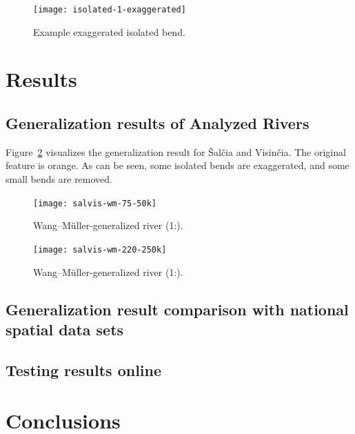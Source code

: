 \documentclass[a4paper]{article}
\newcommand{\WM}{Wang--M{\"u}ller}
\begin{document}
\begin{figure}[ht]
    \centering
    \texttt{[image: isolated-1-exaggerated]}
    \caption{Example exaggerated isolated bend.}
    \label{fig:isolated-1-exaggerated}
\end{figure}

\section{Results}

\subsection{Generalization results of Analyzed Rivers}

Figure~\ref{fig:salvis-wm-75-50k} visualizes the generalization result for
Šalčia and Visinčia. The original feature is orange. As can be seen, some
isolated bends are exaggerated, and some small bends are removed.

\begin{figure}[ht]
    \centering
    \texttt{[image: salvis-wm-75-50k]}
    \caption{{\WM}-generalized river (1:{}).}
    \label{fig:salvis-wm-75-50k}
\end{figure}

\begin{figure}[ht]
    \centering
    \texttt{[image: salvis-wm-220-250k]}
    \caption{{\WM}-generalized river (1:{}).}
    \label{fig:salvis-wm-220-250k}
\end{figure}


\subsection{Generalization result comparison with national spatial data sets}


\subsection{Testing results online}


\section{Conclusions}
\label{sec:conclusions}
\end{document}

